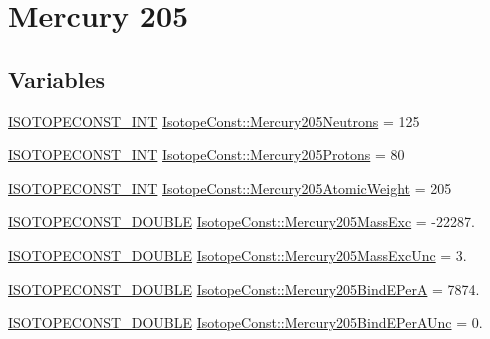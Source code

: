 \hypertarget{group___isotope_const-_mercury-_hg205}{}\section{Mercury 205}
\label{group___isotope_const-_mercury-_hg205}
\subsection*{Variables}
\begin{DoxyCompactItemize}
\item 
\mbox{\hyperlink{group___isotope_const-_macros_ga5f18360b3e99483a35c32d789e62621c}{I\+S\+O\+T\+O\+P\+E\+C\+O\+N\+S\+T\+\_\+\+I\+NT}} \mbox{\hyperlink{group___isotope_const-_mercury-_hg205_ga79cc3fb626f1d44057ef34e01f2dd176}{Isotope\+Const\+::\+Mercury205\+Neutrons}} = 125
\item 
\mbox{\hyperlink{group___isotope_const-_macros_ga5f18360b3e99483a35c32d789e62621c}{I\+S\+O\+T\+O\+P\+E\+C\+O\+N\+S\+T\+\_\+\+I\+NT}} \mbox{\hyperlink{group___isotope_const-_mercury-_hg205_ga27ee2c4b8b88401e30579c11ce46e0c6}{Isotope\+Const\+::\+Mercury205\+Protons}} = 80
\item 
\mbox{\hyperlink{group___isotope_const-_macros_ga5f18360b3e99483a35c32d789e62621c}{I\+S\+O\+T\+O\+P\+E\+C\+O\+N\+S\+T\+\_\+\+I\+NT}} \mbox{\hyperlink{group___isotope_const-_mercury-_hg205_ga1957f01aef92f26ce5fc0a11622b7a8f}{Isotope\+Const\+::\+Mercury205\+Atomic\+Weight}} = 205
\item 
\mbox{\hyperlink{group___isotope_const-_macros_ga8f45a7272ce02c0b4c65c44636ed719a}{I\+S\+O\+T\+O\+P\+E\+C\+O\+N\+S\+T\+\_\+\+D\+O\+U\+B\+LE}} \mbox{\hyperlink{group___isotope_const-_mercury-_hg205_ga6d14bfaa5291d3c317ece51b5c20a688}{Isotope\+Const\+::\+Mercury205\+Mass\+Exc}} = -\/22287.
\item 
\mbox{\hyperlink{group___isotope_const-_macros_ga8f45a7272ce02c0b4c65c44636ed719a}{I\+S\+O\+T\+O\+P\+E\+C\+O\+N\+S\+T\+\_\+\+D\+O\+U\+B\+LE}} \mbox{\hyperlink{group___isotope_const-_mercury-_hg205_ga651fb3ced66d363781dc973dcf7a0a54}{Isotope\+Const\+::\+Mercury205\+Mass\+Exc\+Unc}} = 3.
\item 
\mbox{\hyperlink{group___isotope_const-_macros_ga8f45a7272ce02c0b4c65c44636ed719a}{I\+S\+O\+T\+O\+P\+E\+C\+O\+N\+S\+T\+\_\+\+D\+O\+U\+B\+LE}} \mbox{\hyperlink{group___isotope_const-_mercury-_hg205_gaa7e750a168034baa70bb6abfe22d8cf1}{Isotope\+Const\+::\+Mercury205\+Bind\+E\+PerA}} = 7874.
\item 
\mbox{\hyperlink{group___isotope_const-_macros_ga8f45a7272ce02c0b4c65c44636ed719a}{I\+S\+O\+T\+O\+P\+E\+C\+O\+N\+S\+T\+\_\+\+D\+O\+U\+B\+LE}} \mbox{\hyperlink{group___isotope_const-_mercury-_hg205_ga2c7c990fabe23a263e8aa45806b03800}{Isotope\+Const\+::\+Mercury205\+Bind\+E\+Per\+A\+Unc}} = 0.

\end{DoxyCompactItemize}
